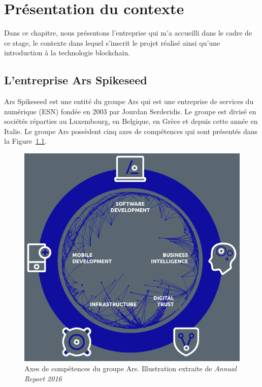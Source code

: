 \documentclass{tnreport}
\begin{document}
\chapter{Présentation du contexte}

Dans ce chapitre, nous présentons l'entreprise qui m'a accueilli dans le cadre de ce stage, le contexte dans lequel s'inscrit le projet réalisé ainsi qu'une introduction à la technologie blockchain.

\section{L'entreprise Ar{\texteta}s Spikeseed}

Ar{\texteta}s Spikeseed est une entité du groupe Ar{\texteta}s qui est une entreprise de services du numérique (ESN) fondée en 2003 par Jourdan Serderidis. 
Le groupe est divisé en sociétés réparties au Luxembourg, en Belgique, en Grèce et depuis cette année en Italie. Le groupe Ar{\texteta}s possèdent cinq axes de compétences qui sont présentés dans la Figure~\ref{fig:arhs-core-services}.

\begin{figure}[h]
	\centering
	\includegraphics[scale=0.7]{figures/arhs-core-services}
	\caption{Axes de compétences du groupe Ar{\texteta}s. Illustration extraite de \textit{Annual Report 2016}~\cite{annual-report}}
	\label{fig:arhs-core-services}
\end{figure}
\end{document}

